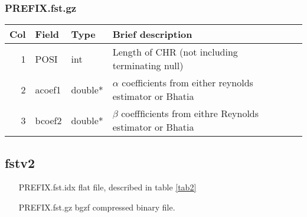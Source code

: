 \documentclass[10pt]{article}
\begin{document}
\subsubsection{PREFIX.fst.gz}
\begin{table}[h]
\begin{tabular}{rllll}
  \hline
  {\bf Col} & {\bf Field} & {\bf Type} & {\bf Brief description} \\
  \hline
  1 & {\sf POSI} & int &  Length of CHR (not including terminating null)\\
  2 & {\sf acoef1} & double* & $\alpha$ coefficients from either reynolds estimator or Bhatia \\
  3 & {\sf bcoef2} & double* & $\beta$ coeffficients from eithre Reynolds estimator or Bhatia\\
  \hline
\end{tabular}\label{tab3}
\end{table}


\subsection{fstv2}

\begin{itemize}
\item[PREFIX.fst.idx] flat file, described in table \ref{tab2}
\item[PREFIX.fst.gz] bgzf compressed binary file.
\end{itemize}
\end{document}
